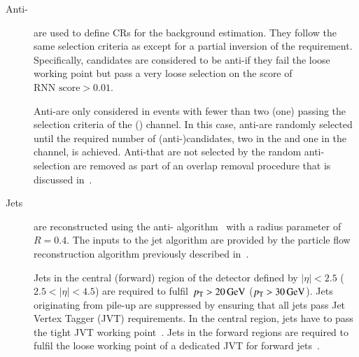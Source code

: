 \begin{description}
\item[Anti-\tauhadvis] are used to define CRs for the \faketauhadvis background
  estimation. They follow the same selection criteria as \tauhadvis except for a
  partial inversion of the \tauid requirement. Specifically, \tauhadvis
  candidates are considered to be anti-\tauhadvis if they fail the loose \tauid
  working point but pass a very loose selection on the \tauid score of
  $\text{RNN score} > 0.01$.

  Anti-\tauhadvis are only considered in events with fewer than two (one)
  \tauhadvis passing the selection criteria of the \hadhad (\lephad) channel. In
  this case, anti-\tauhadvis are randomly selected until the required number of
  (anti-)\tauhadvis candidates, two in the \hadhad and one in the \lephad
  channel, is achieved. Anti-\tauhadvis that are not selected by the random
  anti-\tauhadvis selection
  are removed as part of an overlap removal procedure that is discussed
  in~.


\item[Jets] are reconstructed using the anti-\kt
  algorithm~\cite{Cacciari:2008gp} with a radius parameter of~$R = 0.4$. The
  inputs to the jet algorithm are provided by the particle flow reconstruction
  algorithm previously described in~.


  Jets in the central (forward) region of the detector defined by $|\eta| < 2.5$
  ($2.5 < |\eta| < 4.5$) are required to fulfil~$\pT > \SI{20}{\GeV}$
  ($\pT > \SI{30}{\GeV}$). Jets originating from pile-up are suppressed by
  ensuring that all jets pass Jet Vertex Tagger (JVT) requirements. In the
  central region, jets have to pass the tight JVT working
  point~\cite{PERF-2014-03}. Jets in the forward regions
  are required to fulfil the loose working point of a dedicated JVT for forward
  jets~\cite{PERF-2016-06-witherratum,ATL-PHYS-PUB-2019-026}.


\end{description}
